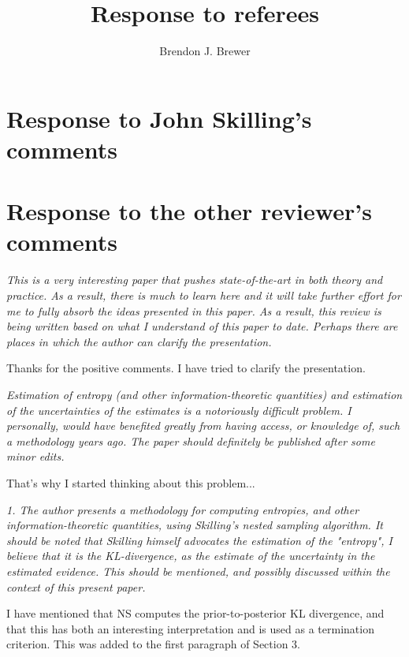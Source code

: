 \documentclass[a4paper, 12pt]{article}
\title{Response to referees}
\author{Brendon J. Brewer}
\date{}
\renewcommand{\quote}{\em \color{orange}}
\begin{document}
\maketitle


\setlength{\parindent}{0pt}
\setlength{\parskip}{8pt}

\section*{Response to John Skilling's comments}


\section*{Response to the other reviewer's comments}

{\quote
This is a very interesting paper that pushes state-of-the-art in both theory and practice.  As a result, there is much to learn here and it will take further effort for me to fully absorb the ideas presented in this paper.  As a result, this review is being written based on what I understand of this paper to date.  Perhaps there are places in which the author can clarify the presentation.}

Thanks for the positive comments. I have tried to clarify the presentation.

{\quote
Estimation of entropy (and other information-theoretic quantities) and estimation of the uncertainties of the estimates is a notoriously difficult problem.  I personally, would have benefited greatly from having access, or knowledge of, such a methodology years ago.  The paper should definitely be published after some minor edits.}

That's why I started thinking about this problem...

{\quote
1. The author presents a methodology for computing entropies, and other information-theoretic quantities, using Skilling's nested sampling algorithm.  It should be noted that Skilling himself advocates the estimation of the "entropy", I believe that it is the KL-divergence, as the estimate of the uncertainty in the estimated evidence.  This should be mentioned, and possibly discussed within the context of this present paper.}

I have mentioned that NS computes the prior-to-posterior KL divergence, and
that this has both an interesting interpretation and is used as a termination
criterion. This was added to the first paragraph of Section 3.
\end{document}
